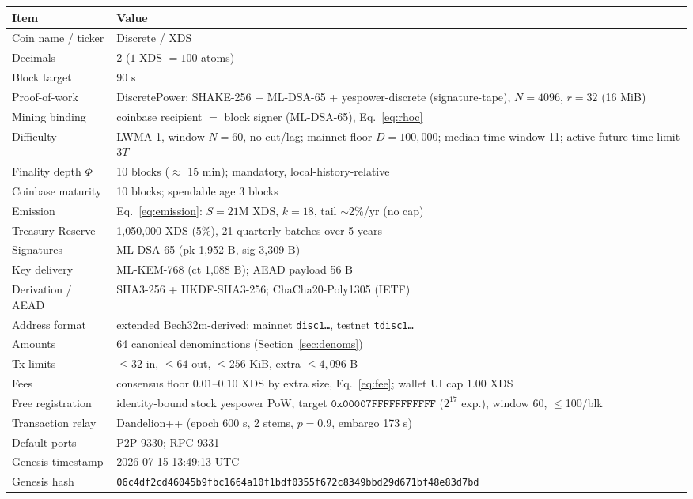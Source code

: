 \documentclass[11pt,a4paper]{article}
\newcommand{\code}[1]{\texttt{\small #1}}
\begin{document}
\begin{table}[htbp]
\centering
\footnotesize
\begin{tabularx}{\textwidth}{@{}lX@{}}
\toprule
\textbf{Item} & \textbf{Value} \\
\midrule
Coin name / ticker & Discrete / XDS \\
Decimals & 2 \quad ($1$ XDS $= 100$ atoms) \\
Block target & 90 s \\
Proof-of-work & DiscretePower: SHAKE-256 + ML-DSA-65 + yespower-discrete (signature-tape), $N{=}4096$, $r{=}32$ (16 MiB) \\
Mining binding & coinbase recipient $=$ block signer (ML-DSA-65), Eq.~\eqref{eq:rhoc} \\
Difficulty & LWMA-1, window $N{=}60$, no cut/lag; mainnet floor $D{=}100{,}000$; median-time window 11; active future-time limit $3T$ \\
Finality depth $\Phi$ & 10 blocks ($\approx$ 15 min); mandatory, local-history-relative \\
Coinbase maturity & 10 blocks; spendable age 3 blocks \\
Emission & Eq.~\eqref{eq:emission}: $S = 21$M XDS, $k = 18$, tail $\sim$2\%/yr (no cap) \\
Treasury Reserve & 1{,}050{,}000 XDS (5\%), 21 quarterly batches over 5 years \\
Signatures & ML-DSA-65 (pk 1{,}952 B, sig 3{,}309 B) \\
Key delivery & ML-KEM-768 (ct 1{,}088 B); AEAD payload 56 B \\
Derivation / AEAD & SHA3-256 + HKDF-SHA3-256; ChaCha20-Poly1305 (IETF) \\
Address format & extended Bech32m-derived; mainnet \code{disc1\ldots}, testnet \code{tdisc1\ldots} \\
Amounts & 64 canonical denominations (Section~\ref{sec:denoms}) \\
Tx limits & $\le 32$ in, $\le 64$ out, $\le 256$ KiB, extra $\le 4{,}096$ B \\
Fees & consensus floor $0.01$--$0.10$ XDS by extra size, Eq.~\eqref{eq:fee}; wallet UI cap $1.00$ XDS \\
Free registration & identity-bound stock yespower PoW, target $\mathtt{0x00007FFF FFFFFFFF}$ ($2^{17}$ exp.), window 60, $\le$100/blk \\
Transaction relay & Dandelion++ (epoch 600 s, 2 stems, $p{=}0.9$, embargo 173 s) \\
Default ports & P2P 9330; RPC 9331 \\
Genesis timestamp & 2026-07-15 13:49:13 UTC \\
Genesis hash & {\scriptsize\texttt{06c4df2cd46045b9fbc1664a10f1bdf0355f672c8349bbd29d671bf48e83d7bd}} \\
\bottomrule
\end{tabularx}
\end{table}
\end{document}
